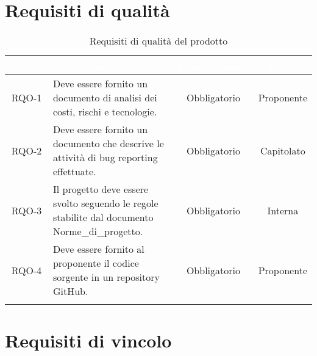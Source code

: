 \section{Requisiti di qualità}

\begingroup
\setlength{\tabcolsep}{10pt}
\renewcommand{\arraystretch}{1.5}
\begin{xltabular}{\textwidth}{| c | X | c | c |}
    \hline
     \textbf{\textcolor{white}{Codice}} & \textbf{\textcolor{white}{Descrizione}} & \textbf{\textcolor{white}{Classificazione}} & \textbf{\textcolor{white}{Fonte}}\\
    \hline
    \endhead
    RQO-1 & Deve essere fornito un documento di analisi dei costi, rischi e tecnologie. & Obbligatorio & Proponente \\
    \hline
    RQO-2 & Deve essere fornito un documento che descrive le attività di bug reporting effettuate. & Obbligatorio & Capitolato \\
    \hline
    RQO-3 & Il progetto deve essere svolto seguendo le regole stabilite dal documento Norme\_di\_progetto. & Obbligatorio & Interna \\
    \hline
    RQO-4 & Deve essere fornito al proponente il codice sorgente in un repository GitHub. & Obbligatorio & Proponente \\
    \hline
     \caption{Requisiti di qualità del prodotto}
    \label{tab:reqqua}
\end{xltabular}
\endgroup
\newpage
\section{Requisiti di vincolo}

